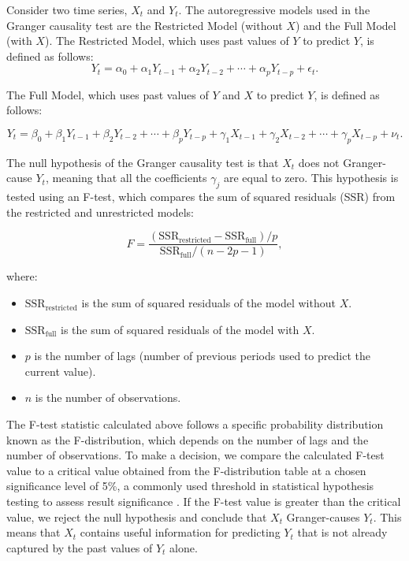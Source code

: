 \documentclass[acmsmall]{acmart}
\begin{document}
Consider two time series, $X_t$ and $Y_t$. The autoregressive models used in the Granger causality test are the Restricted Model (without $X$) and the Full Model (with $X$). The Restricted Model, which uses past values of $Y$ to predict $Y$, is defined as follows:
\begin{equation}
    Y_t = \alpha_0 + \alpha_1 Y_{t-1} + \alpha_2 Y_{t-2} + \cdots + \alpha_p Y_{t-p} + \epsilon_t.
\end{equation}

The Full Model, which uses past values of $Y$ and $X$ to predict $Y$, is defined as follows:


\begin{equation}
    Y_t = \beta_0 + \beta_1 Y_{t-1} + \beta_2 Y_{t-2} + \cdots + \beta_p Y_{t-p} + \gamma_1 X_{t-1}  + \gamma_2 X_{t-2} + \cdots + \gamma_p X_{t-p} + \nu_t.
\end{equation}

The null hypothesis of the Granger causality test is that $X_t$ does not Granger-cause $Y_t$, meaning that all the coefficients $\gamma_j$ are equal to zero. This hypothesis is tested using an F-test, which compares the sum of squared residuals (SSR) from the restricted and unrestricted models:

\begin{equation}
    F = \frac{(\text{SSR}_{\text{restricted}} - \text{SSR}_{\text{full}}) / p}{\text{SSR}_{\text{full}} / (n - 2p - 1)},
\end{equation}

where:
\begin{itemize}
    \item $\text{SSR}_{\text{restricted}}$ is the sum of squared residuals of the model without $X$.
    \item $\text{SSR}_{\text{full}}$ is the sum of squared residuals of the model with $X$.
    \item $p$ is the number of lags (number of previous periods used to predict the current value).
    \item $n$ is the number of observations.
\end{itemize}

The F-test statistic calculated above follows a specific probability distribution known as the F-distribution, which depends on the number of lags and the number of observations. To make a decision, we compare the calculated F-test value to a critical value obtained from the F-distribution table at a chosen significance level of 5\%, a commonly used threshold in statistical hypothesis testing to assess result significance \cite{bruns2019lag}. If the F-test value is greater than the critical value, we reject the null hypothesis and conclude that $X_t$ Granger-causes $Y_t$. This means that $X_t$ contains useful information for predicting $Y_t$ that is not already captured by the past values of $Y_t$ alone.
\end{document}
